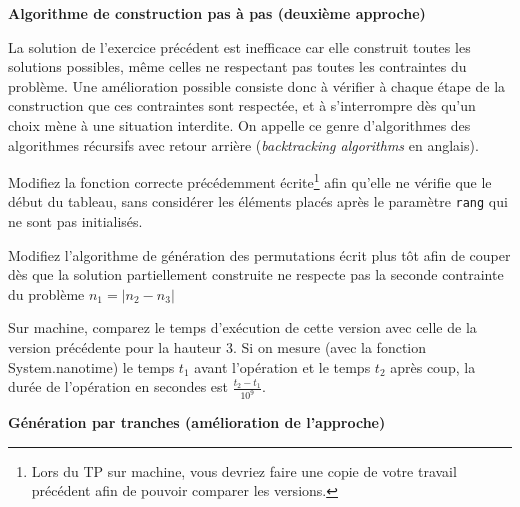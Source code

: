 \documentclass[10pt]{article}\usepackage[nu]{esial}
\begin{document}
\begin{Exercice}\textbf{Algorithme de construction pas à pas (deuxième approche)}

  \noindent La solution de l'exercice précédent est inefficace car elle
  construit toutes les solutions possibles, même celles ne respectant pas toutes
  les contraintes du problème. Une amélioration possible consiste donc à
  vérifier à chaque étape de la construction que ces contraintes sont respectée,
  et à s'interrompre dès qu'un choix mène à une situation interdite.
  On appelle ce genre d'algorithmes des algorithmes récursifs avec retour
  arrière (\textit{backtracking algorithms} en anglais).

  \begin{Question}
    Modifiez la fonction correcte précédemment écrite\footnote{Lors du TP sur
      machine, vous devriez faire une copie de votre travail précédent afin de
      pouvoir comparer les versions.} afin qu'elle ne vérifie
    que le début du tableau, sans considérer les éléments placés après le
    paramètre \texttt{rang} qui ne sont pas initialisés.
  \end{Question}

  \begin{Reponse}
    \newcommand*\FancyVerbStartString{// BEGIN CORRECTE}
    \newcommand*\FancyVerbStopString{// END CORRECTE}
  \end{Reponse}

  \Question %
  Modifiez l'algorithme de génération des permutations écrit plus tôt afin de
  couper dès que la solution partiellement construite ne respecte pas la seconde
  contrainte du problème $n_1=\left|n_2-n_3\right|$

  \begin{Reponse}
    \newcommand*\FancyVerbStartString{// BEGIN GENERE}
    \newcommand*\FancyVerbStopString{// END GENERE}
  \end{Reponse}

  \Question %
  Sur machine, comparez le temps d'exécution de cette version avec celle de la
  version précédente pour la hauteur 3.  Si on mesure (avec la fonction
  System.nanotime) le temps $t_1$ avant l'opération et le temps $t_2$ après
  coup, la durée de l'opération en secondes est $\frac{t_2-t_1}{10^9}$.
\end{Exercice}

\ifcorrection{\newpage}{}
\begin{Exercice}\textbf{Génération par tranches (amélioration de l'approche)}
\end{Exercice}
\end{document}
